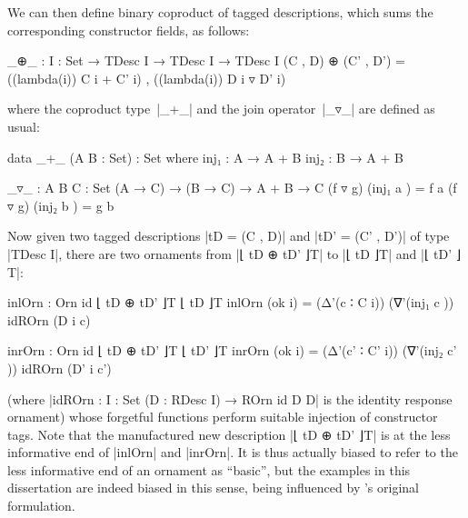 We can then define binary coproduct of tagged descriptions, which sums the corresponding constructor fields, as follows:
\begin{code}
_⊕_ : {I : Set} → TDesc I → TDesc I → TDesc I
(C , D) ⊕ (C' , D') = ((lambda(i)) C i + C' i) , ((lambda(i)) D i ▿ D' i)
\end{code}
where the coproduct type~|_+_| and the join operator~|_▿_| are defined as usual:
\begin{code}
data _+_ (A B : Set) : Set where
  inj₁  : A → A + B
  inj₂  : B → A + B

_▿_ : {A B C : Set} (A → C) → (B → C) → A + B → C
(f ▿ g) (inj₁  a  ) = f a
(f ▿ g) (inj₂  b  ) = g b
\end{code}
Now given two tagged descriptions |tD = (C , D)| and |tD' = (C' , D')| of type |TDesc I|, there are two ornaments from |⌊ tD ⊕ tD' ⌋T| to |⌊ tD ⌋T| and |⌊ tD' ⌋T|:
\begin{code}
inlOrn  : Orn id ⌊ tD ⊕ tD' ⌋T ⌊ tD ⌋T
inlOrn   (ok i) = (Δ'(c   ∶ C i))   (∇'(inj₁  c   ))  idROrn (D i c)

inrOrn  : Orn id ⌊ tD ⊕ tD' ⌋T ⌊ tD' ⌋T
inrOrn   (ok i) = (Δ'(c'  ∶ C' i))  (∇'(inj₂  c'  ))  idROrn (D' i c')
\end{code}
(where |idROrn : {I : Set} (D : RDesc I) → ROrn id D D| is the identity response ornament) whose forgetful functions perform suitable injection of constructor tags.
Note that the manufactured new description |⌊ tD ⊕ tD' ⌋T| is at the less informative end of |inlOrn| and |inrOrn|.
It is thus actually biased to refer to the less informative end of an ornament as ``basic'', but the examples in this dissertation are indeed biased in this sense, being influenced by \citeauthor{McBride-ornaments}'s original formulation.

